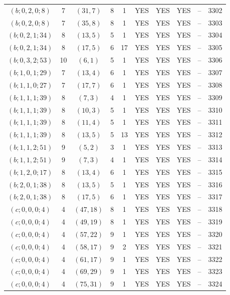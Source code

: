 \begin{longtable}{|c|c|c|c|c|c|c|c|c|c|}
$(b; 0, 2, 0; 8)$ & 7 & $(31, 7)$ & 8 & 1 & YES & YES & YES & -- & 3302\\
$(b; 0, 2, 0; 8)$ & 7 & $(35, 8)$ & 8 & 1 & YES & YES & YES & -- & 3303\\
$(b; 0, 2, 1; 34)$ & 8 & $(13, 5)$ & 5 & 1 & YES & YES & YES & -- & 3304\\
$(b; 0, 2, 1; 34)$ & 8 & $(17, 5)$ & 6 & 17 & YES & YES & YES & -- & 3305\\
$(b; 0, 3, 2; 53)$ & 10 & $(6, 1)$ & 5 & 1 & YES & YES & YES & -- & 3306\\
$(b; 1, 0, 1; 29)$ & 7 & $(13, 4)$ & 6 & 1 & YES & YES & YES & -- & 3307\\
$(b; 1, 1, 0; 27)$ & 7 & $(17, 7)$ & 6 & 1 & YES & YES & YES & -- & 3308\\
$(b; 1, 1, 1; 39)$ & 8 & $(7, 3)$ & 4 & 1 & YES & YES & YES & -- & 3309\\
$(b; 1, 1, 1; 39)$ & 8 & $(10, 3)$ & 5 & 1 & YES & YES & YES & -- & 3310\\
$(b; 1, 1, 1; 39)$ & 8 & $(11, 4)$ & 5 & 1 & YES & YES & YES & -- & 3311\\
$(b; 1, 1, 1; 39)$ & 8 & $(13, 5)$ & 5 & 13 & YES & YES & YES & -- & 3312\\
$(b; 1, 1, 2; 51)$ & 9 & $(5, 2)$ & 3 & 1 & YES & YES & YES & -- & 3313\\
$(b; 1, 1, 2; 51)$ & 9 & $(7, 3)$ & 4 & 1 & YES & YES & YES & -- & 3314\\
$(b; 1, 2, 0; 17)$ & 8 & $(13, 4)$ & 6 & 1 & YES & YES & YES & -- & 3315\\
$(b; 2, 0, 1; 38)$ & 8 & $(13, 5)$ & 5 & 1 & YES & YES & YES & -- & 3316\\
$(b; 2, 0, 1; 38)$ & 8 & $(17, 5)$ & 6 & 1 & YES & YES & YES & -- & 3317\\
$(c; 0, 0, 0; 4)$ & 4 & $(47, 18)$ & 8 & 1 & YES & YES & YES & -- & 3318\\
$(c; 0, 0, 0; 4)$ & 4 & $(49, 19)$ & 8 & 1 & YES & YES & YES & -- & 3319\\
$(c; 0, 0, 0; 4)$ & 4 & $(57, 22)$ & 9 & 1 & YES & YES & YES & -- & 3320\\
$(c; 0, 0, 0; 4)$ & 4 & $(58, 17)$ & 9 & 2 & YES & YES & YES & -- & 3321\\
$(c; 0, 0, 0; 4)$ & 4 & $(61, 17)$ & 9 & 1 & YES & YES & YES & -- & 3322\\
$(c; 0, 0, 0; 4)$ & 4 & $(69, 29)$ & 9 & 1 & YES & YES & YES & -- & 3323\\
$(c; 0, 0, 0; 4)$ & 4 & $(75, 31)$ & 9 & 1 & YES & YES & YES & -- & 3324\\

\end{longtable}
